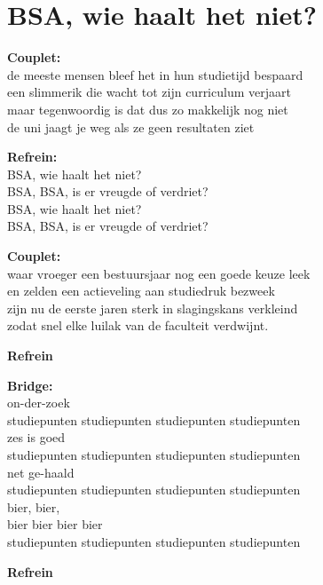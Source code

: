 \section{BSA, wie haalt het niet?}

\textbf{Couplet:}\\
de meeste mensen bleef het in hun studietijd bespaard\\
een slimmerik die wacht tot zijn curriculum verjaart\\
maar tegenwoordig is dat dus zo makkelijk nog niet\\
de uni jaagt je weg als ze geen resultaten ziet

\textbf{Refrein:}\\
BSA, wie haalt het niet?\\
BSA, BSA, is er vreugde of verdriet?\\
BSA, wie haalt het niet?\\
BSA, BSA, is er vreugde of verdriet?

\textbf{Couplet:}\\
waar vroeger een bestuursjaar nog een goede keuze leek\\
en zelden een actieveling aan studiedruk bezweek\\
zijn nu de eerste jaren sterk in slagingskans verkleind\\
zodat snel elke luilak van de faculteit verdwijnt.

\textbf{Refrein}

\textbf{Bridge:}\\
on-der-zoek\\
studiepunten studiepunten studiepunten studiepunten\\
zes is goed\\
studiepunten studiepunten studiepunten studiepunten\\
net ge-haald\\
studiepunten studiepunten studiepunten studiepunten\\
bier, bier,\\
bier bier bier bier\\
studiepunten studiepunten studiepunten studiepunten

\textbf{Refrein}
